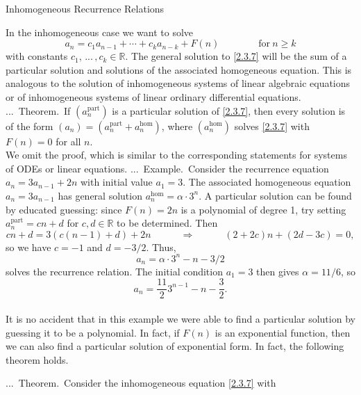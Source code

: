 \documentclass[smaller,hyperref={CJKbookmarks=true}]{beamer}
\newcommand{\R}{\mathbb{R}}
\newcounter{zhuo}[subsection]
\renewcommand{\thezhuo}{\thesection.\thesubsection.\arabic{zhuo}}
\newenvironment{EXAMPLE}{\stepcounter{zhuo}\alert{\!\thezhuo.~Example.\,}}{}
\newenvironment{THEOREM}{\stepcounter{zhuo}\alert{\thezhuo.~Theorem.\,}}{}
\begin{document}
\begin{frame}{Inhomogeneous Recurrence Relations}
\begin{spacing}{1.05}
In the inhomogeneous case we want to solve
\begin{equation}\label{2.3.7}
a_n=c_1a_{n-1}+\cdots+c_ka_{n-k}+F(n)\qquad\qquad
\text{for}~n\geq k
\end{equation}
with constants $c_1,\,...\,,c_k\in\R$. The general solution to \eqref{2.3.7} will be the
sum of a particular solution and solutions of the associated homogeneous
equation. This is analogous to the solution of inhomogeneous systems of
linear algebraic equations or of inhomogeneous systems of linear ordinary
differential equations.\\[5pt]
\begin{THEOREM}
If $(a_n^{\text{part}})$ is a particular solution of \eqref{2.3.7}, then every solution is of the form $(a_n)=(a_n^{\text{part}}+a_n^{\text{hom}})$, where $(a_n^{\text{hom}})$ solves \eqref{2.3.7} with $F(n)=0$ for all $n$.\\[5pt]
We omit the proof, which is similar to the corresponding statements for
systems of ODEs or linear equations.
\end{THEOREM}
\newpage
\begin{EXAMPLE}
Consider the recurrence equation $a_n=3a_{n-1}+2n$ with initial value $a_1=3$. The associated homogeneous equation $a_n=3a_{n-1}$ has general solution $a_n^{\text{hom}}=\alpha\cdot3^n$. A particular solution can be found by educated guessing: since $F(n)=2n$ is a polynomial of degree 1, try setting $a_n^{\text{part}}=cn+d$ for $c,d\in\R$ to be determined. Then
\[cn+d=3(c(n-1)+d)+2n\qquad\quad\Rightarrow\qquad\quad
(2+2c)n+(2d-3c)=0,\]
so we have $c=-1$ and $d=-3/2$. Thus,
\[a_n=\alpha\cdot 3^n-n-3/2\]
solves the recurrence relation. The initial condition $a_1=3$ then gives $\alpha=11/6$, so
\[a_n=\frac{11}{2}3^{n-1}-n-\frac{3}{2}.\]
\end{EXAMPLE}
 \\[11pt]
It is no accident that in this example we were able to find a particular
solution by guessing it to be a polynomial. In fact, if $F(n)$ is an
exponential function, then we can also find a particular solution of
exponential form. In fact, the following theorem holds.
\end{spacing}
\newpage
\begin{spacing}{0.6}
\begin{THEOREM}
Consider the inhomogeneous equation \eqref{2.3.7} with

\end{THEOREM}
\end{spacing}
\end{frame}
\end{document}
